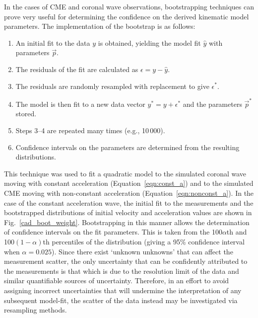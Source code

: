 \documentclass[referee]{aa}
\begin{document}
In the cases of CME and coronal wave observations, bootstrapping techniques can prove very useful for determining the confidence on the derived kinematic model parameters. The implementation of the bootstrap is as follows:
\begin{enumerate}
\item An initial fit to the data $y$ is obtained, yielding the model fit $\hat{y}$ with parameters $\vec{p}$.
\item The residuals of the fit are calculated as $\epsilon = y - \hat{y}$.
\item The residuals are randomly resampled with replacement to give $\epsilon^*$.
\item The model is then fit to a new data vector $y^* = y + \epsilon^*$ and the parameters $\vec{p}^*$ stored.
\item Steps 3--4 are repeated many times (e.g., 10\,000).
\item Confidence intervals on the parameters are determined from the resulting distributions.
\end{enumerate}
This technique was used to fit a quadratic model to the simulated coronal wave moving with constant acceleration (Equation~\ref{eqn:const_a}) and to the simulated CME moving with non-constant acceleration (Equation~\ref{eqn:nonconst_a}). In the case of the constant acceleration wave, the initial fit to the measurements and the bootstrapped distributions of initial velocity and acceleration values are shown in Fig.~\ref{cad_boot_weight}. Bootstrapping in this manner allows the determination of confidence intervals on the fit parameters. This is taken from the 100$\alpha$th and 100$\left(1-\alpha\right)$th percentiles of the distribution (giving a 95\% confidence interval when $\alpha=0.025$). Since there exist `unknown unknowns' that can affect the measurement scatter, the only uncertainty that can be confidently attributed to the measurements is that which is due to the resolution limit of the data and similar quantifiable sources of uncertainty. Therefore, in an effort to avoid assigning incorrect uncertainties that will undermine the interpretation of any subsequent model-fit, the scatter of the data instead may be investigated via resampling methods.
\end{document}
